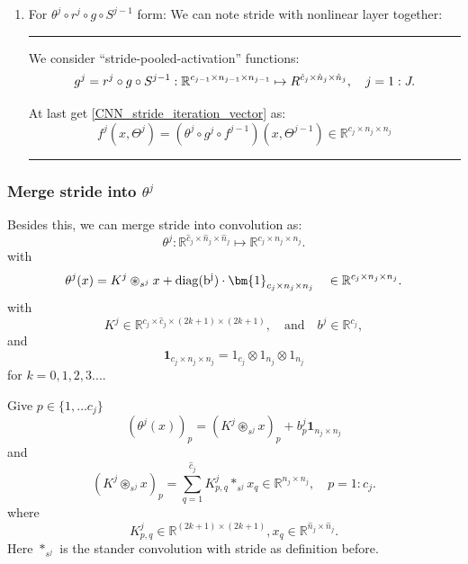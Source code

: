 \begin{enumerate}
	\item {\color{red} For $\theta^j\circ r^j\circ g \circ S^{j-1} $ form:} We can note stride with nonlinear layer together:
	\bigskip \hrule \bigskip  
	We consider ``stride-pooled-activation'' functions:
	\begin{equation}\label{CNN_iteration_vector}
	g^j=r^j\circ g \circ S^{j-1}:  \mathbb R^{c_{j-1} \times n_{j-1} \times n_{j-1} }\mapsto
	\mathbb  \mathbb R^{\hat c_j \times \hat n_{j} \times \hat n_j }, \quad j  = 1:J. 
	\end{equation}
	
	At last get \eqref{CNN_stride_iteration_vector} as:
	\begin{equation}\label{CNN_stride_iteration_vector_2}
	f^j(x,\Theta^j) = (\theta^j \circ g^j\circ f^{j-1})(x,\Theta^{j-1}) \in \mathbb{R}^{c_j \times n_j \times n_j }
	\end{equation}
	\bigskip \hrule \bigskip  
	
\end{enumerate}

\subsubsection{Merge stride into $\theta^j$}
Besides this,  we can merge stride into convolution as:
\begin{equation}
\theta^j: \mathbb R^{\hat c_j \times \hat{n}_{j} \times \hat n_{j} } \mapsto \mathbb{R}^{c_j \times n_{j} \times n_j }.
\end{equation}
with
\begin{equation}
\theta^j(x) = K^j \circledast_{s^j} x + {\rm{diag}(b^j)} \cdot \bm{1}_{c_j \times n_j \times n_j} \quad
\in\mathbb R^{c_j\times n_j\times n_j}.
\end{equation}
with 
\begin{equation}
K^j \in \mathbb{R}^{ c_{j} \times \hat c_{j} \times (2k+1) \times (2k+1)},  \quad \text{and} \quad b^j \in \mathbb{R}^{c_j},
\end{equation}
and 
\begin{equation}
\bm{1}_{c_j \times n_j \times n_j} = 1_{c_{j}} \otimes 1_{n_j} \otimes 1_{n_j}
\end{equation}
for $k = 0, 1, 2, 3...$.

Give $p\in \{1,\ldots c_j\}$
\begin{equation}
(\theta^j(x))_p= (K^j \circledast_{s^j} x)_p+b^j_p{\bm 1}_{n_j\times n_j}
\end{equation}
and
\begin{equation}
(K^j \circledast_{s^j} x)_p
= \sum_{q=1}^{\hat c_{j}} K^{j}_{p,q} \ast_{s^j} x_q \in \mathbb{R}^{n_j \times n_j}, \quad p= 1:c_j.
\end{equation}
where
$$
K^{j}_{p,q}\in \mathbb R^{(2k+1)\times (2k+1)}, x_q\in \mathbb
R^{\hat n_{j}\times \hat n_{j}}.
$$
Here $\ast_{s^j}$ is the stander convolution with stride as definition before.


